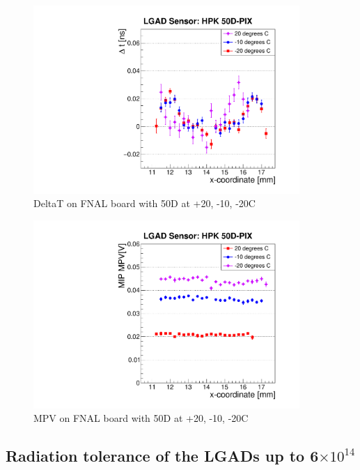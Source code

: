 \documentclass[preprint,1p]{elsarticle}
\begin{document}
\begin{figure}[htbp] 
\centering
\includegraphics[width=0.9\textwidth]{figs/FNAL_MeanTime_vs_X_HPK50D_TemperatureDependance.pdf} 
\caption{DeltaT on FNAL board with 50D at +20, -10, -20C} 
\label{fig:Sensors} 
\end{figure} 


\begin{figure}[htbp] 
\centering
\includegraphics[width=0.9\textwidth]{figs/FNAL_MPV_vs_X_HPK50D_TemperatureDependance.pdf} 
\caption{MPV on FNAL board with 50D at +20, -10, -20C} 
\label{fig:Sensors} 
\end{figure} 

\subsection{Radiation tolerance of the LGADs up to 6$\times 10^{14}$}
\end{document}
